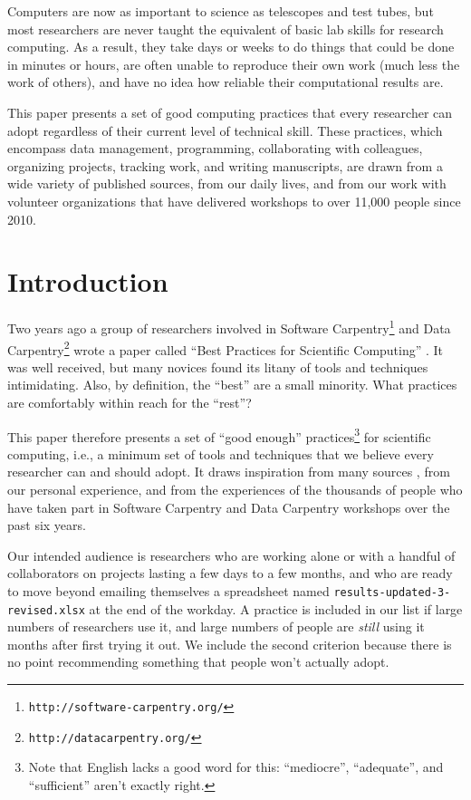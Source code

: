 \documentclass[10pt,letterpaper]{article}
\newcommand{\withurl}[2]{{#1}\footnote{{\texttt{#2}}}}
\begin{document}
Computers are now as important to science as telescopes and test
tubes, but most researchers are never taught the equivalent of basic
lab skills for research computing.  As a result, they take days or
weeks to do things that could be done in minutes or hours, are often
unable to reproduce their own work (much less the work of others), and
have no idea how reliable their computational results are.

This paper presents a set of good computing practices that every
researcher can adopt regardless of their current level of technical
skill.  These practices, which encompass data management, programming,
collaborating with colleagues, organizing projects, tracking work, and
writing manuscripts, are drawn from a wide variety of published
sources, from our daily lives, and from our work with volunteer
organizations that have delivered workshops to over 11,000 people
since 2010.

\linenumbers

\section*{Introduction}\label{sec:introduction}

Two years ago a group of researchers involved in \withurl{Software
Carpentry}{http://software-carpentry.org/} and \withurl{Data
Carpentry}{http://datacarpentry.org/} wrote a paper called
``Best Practices for Scientific Computing'' \cite{wilson2014}.
It was well received, but many novices found its
litany of tools and techniques intimidating.  Also, by definition, the
``best'' are a small minority.
What practices are comfortably within reach for the ``rest''?

This paper therefore presents a set of ``good enough''
practices\footnote{Note that English lacks a good word for this:
  ``mediocre'', ``adequate'', and ``sufficient'' aren't exactly
  right.} for scientific computing, i.e., a minimum set of tools and
techniques that we believe every researcher can and should adopt. It
draws inspiration from many sources
\cite{gentzkow2014,noble2009,brown2015,wickham2014,kitzes2016,sandve2013,hart2015},
from our personal experience, and from the experiences of the
thousands of people who have taken part in Software Carpentry and
Data Carpentry workshops over the past six years.

Our intended audience is researchers who are working alone or with a
handful of collaborators on projects lasting a few days to a few
months, and who are ready to move beyond emailing themselves a spreadsheet
named \texttt{results-updated-3-revised.xlsx} at the end of the workday. A
practice is included in our list if large numbers of researchers use
it, and large numbers of people are \emph{still} using it months
after first trying it out. We include the second criterion because
there is no point recommending something that people won't actually
adopt.
\end{document}

